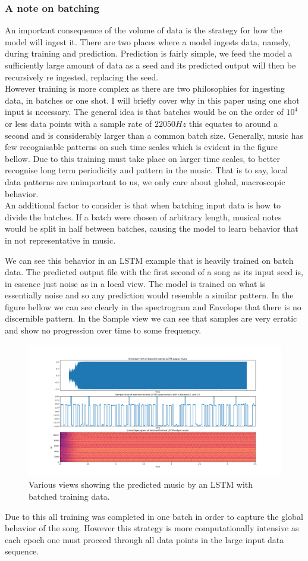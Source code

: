\documentclass{article}
\begin{document}
\subsubsection{A note on batching}
An important consequence of the volume of data is the strategy for how the model will ingest it. 
There are two places where a model ingests data, namely, during training and prediction. Prediction is fairly simple, we feed the model a sufficiently large amount of data as a seed and its predicted output will then be recursively re ingested, replacing the seed.\\
However training is more complex as there are two philosophies for ingesting data, in batches or one shot. I will briefly cover why in this paper using one shot input is necessary. The general idea is that batches would be on the order of $10^4$ or less data points with a sample rate of $22050 Hz$ this equates to around a second and is considerably larger than a common batch size. Generally, music has few recognisable patterns on such time scales which is evident in the figure bellow. Due to this training must take place on larger time scales, to better recognise long term periodicity and pattern in the music. That is to say, local data patterns are unimportant to us, we only care about global, macroscopic behavior.\\
An additional factor to consider is that when batching input data is how to divide the batches. If a batch were chosen of arbitrary length, musical notes would be split in half between batches, causing the model to learn behavior that in not representative in music. 


We can see this behavior in an LSTM example that is heavily trained on batch data. The predicted output file with the first second of a song as its input seed is, in essence just noise as in a local view. The model is trained on what is essentially noise and so any prediction would resemble a similar pattern. In the figure bellow we can see clearly in the spectrogram and Envelope that there is no discernible pattern. In the Sample view we can see that samples are very erratic and show no progression over time to some frequency. 
\begin{figure}[H]
\caption{Various views showing the predicted music by an LSTM with batched training data. }
\includegraphics[scale=0.35]{batch_training.png}
\end{figure}
Due to this all training was completed in one batch in order to capture the global behavior of the song. However this strategy is more computationally intensive as each epoch one must proceed through all data points in the large input data sequence. 
\end{document}
